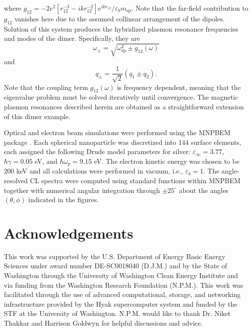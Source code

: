 \documentclass [11pt, proquest] {uwthesis}[2016/11/22]
\begin{document}
where $g_{12}=-2e^2[r_{12}^{-3} - ikr_{12}^{-2}]e^{ikr_{12}}/\varepsilon_bm_{\textrm{sp}}.$ Note that the far-field contribution to $g_{12}$ vanishes here due to the assumed collinear arrangement of the dipoles. Solution of this system produces the hybridized plasmon resonance frequencies and modes of the dimer. Specifically, they are
\begin{equation}
\omega_{\pm} = \sqrt{\omega_{\textrm{sp}}^2 \pm g_{12}(\omega)}
\label{eigenvalues}
\end{equation}
and
\begin{equation}
q_{\pm} = \frac{1}{\sqrt{2}}\left(q_1 \pm q_2\right).
\label{eigenvectors}
\end{equation}
Note that the coupling term $g_{12}(\omega)$ is frequency dependent, meaning that the eigenvalue problem must be solved iteratively until convergence. The magnetic plasmon resonances described herein are obtained as a straightforward extension of this dimer example.




 Optical and electron beam simulations were performed using the MNPBEM package \cite{Hohenester2012,Hohenester2014}. Each spherical nanoparticle was discretized into 144 surface elements, each assigned the following Drude model parameters for silver: $\varepsilon_{\infty} = 3.77$, $\hbar\gamma = 0.05$ eV, and $\hbar\omega_{p} = 9.15$ eV. The electron kinetic energy was chosen to be 200 keV and all calculations were performed in vacuum, i.e., $\varepsilon_{b}=1.$ The angle-resolved CL spectra were computed using standard functions within MNPBEM together with numerical angular integration through $\pm25^\circ$ about the angles $(\theta,\phi)$ indicated in the figures.


\section{Acknowledgements}
This work was supported by the U.S. Department of Energy Basic Energy Sciences under award number DE-SC0018040 (D.J.M.) and by the State of Washington through the University of Washington Clean Energy Institute and via funding from the Washington Research Foundation (N.P.M.). This work was facilitated through the use of advanced computational, storage, and networking infrastructure provided by the Hyak supercomputer system and funded by the STF at the University of Washington. N.P.M. would like to thank Dr. Niket Thakkar and Harrison Goldwyn for helpful discussions and advice.
\end{document}
